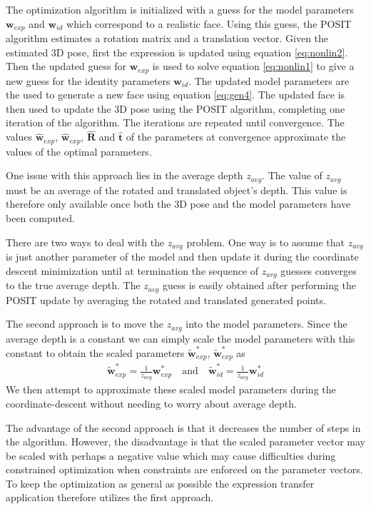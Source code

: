 \documentclass[11pt,a4paper,twoside]{report}
\begin{document}
The optimization algorithm is initialized with a guess for the
model parameters $\mathbf{w}_{exp}$ and $\mathbf{w}_{id}$ which correspond
to a realistic face. Using this guess, the POSIT algorithm estimates a rotation
matrix and a translation vector. Given the estimated 3D pose, first the
expression is updated using equation \ref{eq:nonlin2}. Then the updated guess
for $\mathbf{w}_{exp}$ is used to solve equation \ref{eq:nonlin1} to give a new
guess for the identity parameters $\mathbf{w}_{id}$. The updated model
parameters are the used to generate a new face using equation
\ref{eq:gen4}. The updated face is then used to update the 3D pose using
the POSIT algorithm, completing one iteration of the algorithm. The iterations are repeated until convergence. The values $\mathbf{\hat{w}}_{exp}$, $\mathbf{\hat{w}}_{exp}$,
$\mathbf{\hat{R}}$ and $\mathbf{\hat{t}}$ of the parameters at convergence
approximate the values of the optimal parameters.

One issue with this approach lies in the average depth $z_{avg}$. The value of
$z_{avg}$ must be an average of the rotated and translated object's depth. This
value is therefore only available once both the 3D pose and the model
parameters have been computed.

There are two ways to deal with the $z_{avg}$ problem. One way is to assume that
$z_{avg}$ is just another parameter of the model and then update it during the coordinate
descent minimization until at termination the sequence of $z_{avg}$ guesses
converges to the true average depth. The $z_{avg}$ guess is easily obtained
after performing the POSIT update by averaging the rotated and translated generated points.

The second approach is to move the $z_{avg}$ into the model parameters. Since
the average depth is a constant we can simply scale the model parameters with
this constant to obtain the scaled parameters $\mathbf{\tilde{w}}^*_{exp}$,
$\mathbf{\tilde{w}}^*_{exp}$ as
\begin{align*}
\mathbf{\tilde{w}}^*_{exp} = \frac{1}{z_{avg}}\mathbf{w}^*_{exp} \quad
\textrm{and} \quad
\mathbf{\tilde{w}}^*_{id} = \frac{1}{z_{avg}}\mathbf{w}^*_{id}
\end{align*}
We then attempt to approximate these scaled model parameters during the
coordinate-descent without needing to worry about average depth.

The advantage of the second approach is that it decreases the number of steps in
the algorithm. However, the disadvantage is that the scaled parameter vector may
be scaled with perhaps a negative value which may cause difficulties during constrained
optimization when constraints are enforced on the parameter vectors. To keep the
optimization as general as possible the expression transfer application
therefore utilizes the first approach.
\end{document}
